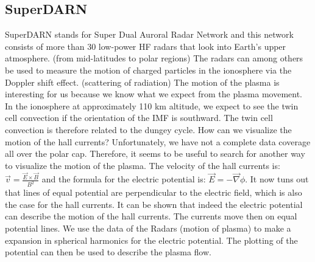 \documentclass[10pt,a4paper]{article}
\begin{document}
\clearpage

\subsection{SuperDARN}

SuperDARN stands for  Super Dual Auroral Radar Network and this network consists of more than 30 low-power HF radars that look into Earth's upper atmosphere. (from mid-latitudes to polar regions) The radars can among others be used to measure the motion of charged particles in the ionosphere via the Doppler shift effect. (scattering of radiation)
The motion of the plasma is interesting for us because we know what we expect from the plasma movement. In the ionosphere at approximately 110 km altitude, we expect to see the twin cell convection if the orientation of the IMF is southward. The twin cell convection is therefore related to the dungey cycle. 
How can we visualize the motion of the hall currents? Unfortunately, we have not a complete data coverage all over the polar cap. Therefore, it seems to be useful to search for another way to visualize the motion of the plasma. 
The velocity of the hall currents is: $\vec{v}=\frac{\vec{E}\times \vec{B}}{B^2}$ and the formula for the electric potential is: $\vec{E}=-\vec{\nabla} \phi$. It now tuns out that lines of equal potential are perpendicular to the electric field, which is also the case for the hall currents. It can be shown that indeed the electric potential can describe the motion of the hall currents. The currents move then on equal potential lines. 
We use the data of the Radars (motion of plasma) to make a expansion in spherical harmonics for the electric potential. The plotting of the potential can then be used to describe the plasma flow. 
\end{document}
